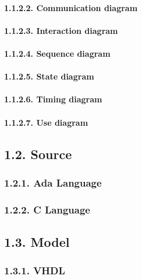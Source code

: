 \documentclass[]{article}
\let\oldparagraph\paragraph
\renewcommand{\paragraph}[1]{\oldparagraph{#1}\mbox{}}
\begin{document}
\paragraph{1.1.2.2. Communication diagram}\label{communication-diagram}

\paragraph{1.1.2.3. Interaction diagram}\label{interaction-diagram}

\paragraph{1.1.2.4. Sequence diagram}\label{sequence-diagram}

\paragraph{1.1.2.5. State diagram}\label{state-diagram}

\paragraph{1.1.2.6. Timing diagram}\label{timing-diagram}

\paragraph{1.1.2.7. Use diagram}\label{use-diagram}

\subsection{1.2. Source}\label{source}

\subsubsection{1.2.1. Ada Language}\label{ada-language}

\subsubsection{1.2.2. C Language}\label{c-language}

\subsection{1.3. Model}\label{model}

\subsubsection{1.3.1. VHDL}\label{vhdl}
\end{document}
